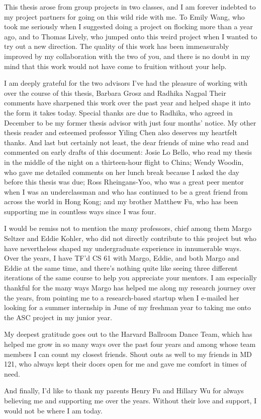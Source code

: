 
This thesis arose from group projects in two classes, and I am forever indebted
to my project partners for going on this wild ride with me.
To Emily Wang, who took me seriously when I suggested doing a project on
flocking more than a year ago, and to Thomas Lively, who jumped onto this weird
project when I wanted to try out a new direction.
The quality of this work has been immeasurably improved by my collaboration
with the two of you, and there is no doubt in my mind that this work would not
have come to fruition without your help.

I am deeply grateful for the two advisors I've had the pleasure of working with
over the course of this thesis, Barbara Grosz and Radhika Nagpal
Their comments have sharpened this work over the past year and helped shape it
into the form it takes today.
Special thanks are due to Radhika, who agreed in December to be my former
thesis advisor with just four months' notice.
My other thesis reader and esteemed professor Yiling Chen also deserves my
heartfelt thanks.
And last but certainly not least, the dear friends of mine who read and
commented on early drafts of this document: Josie Lo Bello, who read
my thesis in the middle of the night on a thirteen-hour flight to China; Wendy
Woodin, who gave me detailed comments on her lunch break because I asked the
day before this thesis was due; Ross Rheingans-Yoo, who was a great peer
mentor when I was an underclassman and who has continued to be a great friend
from across the world in Hong Kong; and my brother Matthew Fu, who has been
supporting me in countless ways since I was four.

I would be remiss not to mention the many professors, chief among them Margo
Seltzer and Eddie Kohler, who did not directly contribute to this project but
who have nevertheless shaped my undergraduate experience in innumerable ways.
Over the years, I have TF'd CS 61 with Margo, Eddie, and both Margo and Eddie
at the same time, and there's nothing quite like seeing three different
iterations of the same course to help you appreciate your mentors.
I am especially thankful for the many ways Margo has helped me along my
research journey over the years, from pointing me to a research-based startup
when I e-mailed her looking for a summer internship in June of my freshman year
to taking me onto the ASC project in my junior year.

My deepest gratitude goes out to the Harvard Ballroom Dance Team, which has
helped me grow in so many ways over the past four years and among whose team
members I can count my closest friends.
Shout outs as well to my friends in MD 121, who always kept their doors open
for me and gave me comfort in times of need.

And finally, I'd like to thank my parents Henry Fu and Hillary Wu for always
believing me and supporting me over the years.
Without their love and support, I would not be where I am today. 
